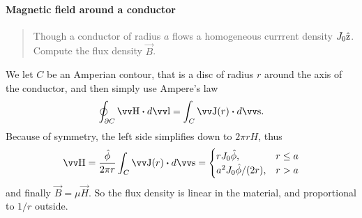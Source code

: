 \documentclass[margin=small]{tex/hsrzf}
\theoremstyle{elmagzf}
\begin{document}
\paragraph{Magnetic field around a conductor}
\begin{quote}
  Though a conductor of radius \(a\) flows a homogeneous currrent density
  \(J_0\hat{\mathrm{z}}\). Compute the flux density \(\vec{B}\).
\end{quote}

We let \(C\) be an Amperian contour, that is a disc of radius \(r\) around the
axis of the conductor, and then simply use Ampere's law 
\[
  \oint_{\partial C} \vec{H} \dotp d\vec{l} = \int_C \vec{J}(r) \dotp d\vec{s}.
\]
Because of symmetry, the left side simplifies down to \(2\pi r H\), thus
\[
  \vec{H} = \frac{\uvec{\phi}}{2\pi r} \int_C \vec{J}(r) \dotp d\vec{s} =
    \begin{cases}
      r J_0 \uvec{\phi}, & r \leq a \\
      a^2 J_0 \uvec{\phi} / (2r) , & r > a \\
    \end{cases}
\]
and finally \(\vec{B} = \mu \vec{H}\). So the flux density is linear in the
material, and proportional to \(1/r\) outside.
\end{document}
